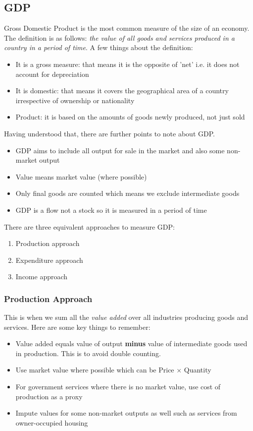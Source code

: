 \documentclass[12pt, letterpaper]{article}
\begin{document}
{\subsection{GDP}
Gross Domestic Product is the most common measure of the size of an economy. The definition is as follows: \textit{the value of all goods and services produced in a country in a period of time}. A few things about the definition:
\begin{itemize}
	\item It is a gross measure: that means it is the opposite of 'net' i.e. it does not account for depreciation
	\item It is domestic: that means it covers the geographical area of a country irrespective of ownership or nationality
	\item Product: it is based on the amounts of goods newly produced, not just sold
\end{itemize}
Having understood that, there are further points to note about GDP.
\begin{itemize}
	\item GDP aims to include all output for sale in the market and also some non-market output
	\item Value means market value (where possible)
	\item Only final goods are counted which means we exclude intermediate goods
	\item GDP is a flow not a stock so it is measured in a period of time
\end{itemize}
There are three equivalent approaches to measure GDP:
\begin{enumerate}
	\item Production approach
	\item Expenditure approach
	\item Income approach
\end{enumerate}

\subsubsection{Production Approach}
This is when we sum all the \textit{value added} over all industries producing goods and services. Here are some key things to remember:
\begin{itemize}
	\item Value added equals value of output \textbf{minus} value of intermediate goods used in production. This is to avoid double counting.
	\item Use market value where possible which can be Price $\times$ Quantity
	\item For government services where there is no market value, use cost of production as a proxy
	\item Impute values for some non-market outputs as well such as services from owner-occupied housing
\end{itemize}

}
\end{document}
